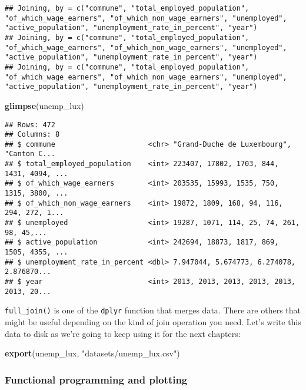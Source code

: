 \documentclass[
]{article}
\newenvironment{Shaded}{\begin{snugshade}}{\end{snugshade}}
\newcommand{\KeywordTok}[1]{\textcolor[rgb]{0.13,0.29,0.53}{\textbf{#1}}}
\newcommand{\NormalTok}[1]{#1}
\newcommand{\StringTok}[1]{\textcolor[rgb]{0.31,0.60,0.02}{#1}}
\begin{document}
\begin{verbatim}
## Joining, by = c("commune", "total_employed_population", "of_which_wage_earners", "of_which_non_wage_earners", "unemployed", "active_population", "unemployment_rate_in_percent", "year")
## Joining, by = c("commune", "total_employed_population", "of_which_wage_earners", "of_which_non_wage_earners", "unemployed", "active_population", "unemployment_rate_in_percent", "year")
## Joining, by = c("commune", "total_employed_population", "of_which_wage_earners", "of_which_non_wage_earners", "unemployed", "active_population", "unemployment_rate_in_percent", "year")
\end{verbatim}

\begin{Shaded}
\begin{Highlighting}[]
\KeywordTok{glimpse}\NormalTok{(unemp\_lux)}
\end{Highlighting}
\end{Shaded}

\begin{verbatim}
## Rows: 472
## Columns: 8
## $ commune                      <chr> "Grand-Duche de Luxembourg", "Canton C...
## $ total_employed_population    <int> 223407, 17802, 1703, 844, 1431, 4094, ...
## $ of_which_wage_earners        <int> 203535, 15993, 1535, 750, 1315, 3800, ...
## $ of_which_non_wage_earners    <int> 19872, 1809, 168, 94, 116, 294, 272, 1...
## $ unemployed                   <int> 19287, 1071, 114, 25, 74, 261, 98, 45,...
## $ active_population            <int> 242694, 18873, 1817, 869, 1505, 4355, ...
## $ unemployment_rate_in_percent <dbl> 7.947044, 5.674773, 6.274078, 2.876870...
## $ year                         <int> 2013, 2013, 2013, 2013, 2013, 2013, 20...
\end{verbatim}

\texttt{full\_join()} is one of the \texttt{dplyr} function that merges data. There are others that might be
useful depending on the kind of join operation you need. Let's write this data to disk as we're
going to keep using it for the next chapters:

\begin{Shaded}
\begin{Highlighting}[]
\KeywordTok{export}\NormalTok{(unemp\_lux, }\StringTok{"datasets/unemp\_lux.csv"}\NormalTok{)}
\end{Highlighting}
\end{Shaded}

\hypertarget{functional-programming-and-plotting}{%
\subsubsection{Functional programming and plotting}\label{functional-programming-and-plotting}}
\end{document}
